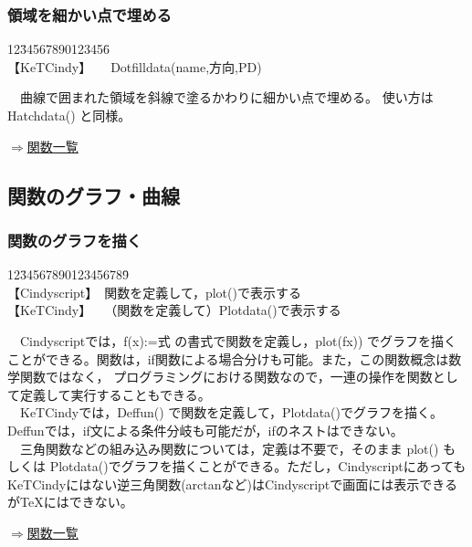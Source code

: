 \documentclass[papersize,a4paper,12pt,uplatex]{jsarticle}
\begin{document}
\subsubsection{領域を細かい点で埋める}

\begin{tabbing}
12\=34567890123456\=\kill\\

 \>【KeTCindy】　　\>Dotfilldata(name,方向,PD)\\
\end{tabbing}
　曲線で囲まれた領域を斜線で塗るかわりに細かい点で埋める。 使い方はHatchdata() と同様。\\
\begin{flushright} \hyperlink{functionlist3d}{$\Rightarrow$関数一覧}\end{flushright}


\subsection{関数のグラフ・曲線}

\subsubsection{関数のグラフを描く}
\begin{tabbing}
12\=34567890123456789\=\kill\\

\>【Cindyscript】　\>関数を定義して，plot()で表示する　\\
 \>【KeTCindy】　　\>（関数を定義して）Plotdata()で表示する　\\
\end{tabbing}

　Cindyscriptでは，f(x):=式 の書式で関数を定義し，plot(fx)) でグラフを描くことができる。関数は，if関数による場合分けも可能。また，この関数概念は数学関数ではなく， プログラミングにおける関数なので，一連の操作を関数として定義して実行することもできる。\\
　KeTCindyでは，Deffun() で関数を定義して，Plotdata()でグラフを描く。Deffunでは，if文による条件分岐も可能だが，ifのネストはできない。\\
　三角関数などの組み込み関数については，定義は不要で，そのまま plot() もしくは Plotdata()でグラフを描くことができる。ただし，CindyscriptにあってもKeTCindyにはない逆三角関数(arctanなど)はCindyscriptで画面には表示できるがTeXにはできない。\\

\begin{flushright} \hyperlink{functionlist3d}{$\Rightarrow$関数一覧}\end{flushright}
\end{document}
